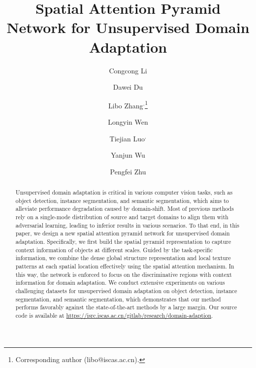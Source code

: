 \documentclass[runningheads]{llncs}
\begin{document}
\pagestyle{headings}
\mainmatter
\def\ECCVSubNumber{1951}  

\title{Spatial Attention Pyramid Network for Unsupervised Domain Adaptation} 


\newcommand*\samethanks[1][\value{footnote}]{\footnotemark[#1]}
\author{Congcong Li\and
Dawei Du\and
Libo Zhang$^,$\thanks{Corresponding author (libo@iscas.ac.cn).}\and
Longyin Wen\and
Tiejian Luo$^,$\samethanks\and
Yanjun Wu\and
Pengfei Zhu}

\maketitle

\begin{abstract}
Unsupervised domain adaptation is critical in various computer vision tasks, such as object detection, instance segmentation, and semantic segmentation, which aims to alleviate performance degradation caused by domain-shift. Most of previous methods rely on a single-mode distribution of source and target domains to align them with adversarial learning, leading to inferior results in various scenarios. To that end, in this paper, we design a new spatial attention pyramid network for unsupervised domain adaptation. Specifically, we first build the spatial pyramid representation to capture context information of objects at different scales. Guided by the task-specific information, we combine the dense global structure representation and local texture patterns at each spatial location effectively using the spatial attention mechanism. In this way, the network is enforced to focus on the discriminative regions with context information for domain adaptation. We conduct extensive experiments on various challenging datasets for unsupervised domain adaptation on object detection, instance segmentation, and semantic segmentation, which demonstrates that our method performs favorably against the state-of-the-art methods by a large margin. Our source code is available at \url{https://isrc.iscas.ac.cn/gitlab/research/domain-adaption}.
\end{abstract}
\end{document}
